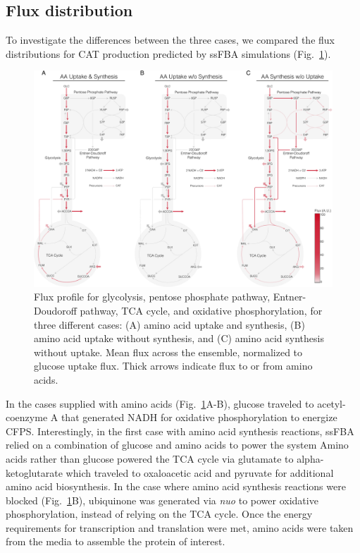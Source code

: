 \documentclass[journal=asbcd6,manuscript=article]{achemso}
\begin{document}
\subsection{Flux distribution}
To investigate the differences between the three cases, we compared the flux distributions for CAT production predicted by ssFBA simulations (Fig.~\ref{fig:flux}).
\begin{figure}[t!]
\includegraphics[width=1.00\textwidth]{./Figures/Flux.pdf}
\caption{Flux profile for glycolysis, pentose phosphate pathway, Entner-Doudoroff pathway, TCA cycle, and oxidative phosphorylation, for three different cases: (A) amino acid uptake and synthesis, (B) amino acid uptake without synthesis, and (C) amino acid synthesis without uptake. Mean flux across the ensemble, normalized to glucose uptake flux. Thick arrows indicate flux to or from amino acids.}
\label{fig:flux}
\end{figure}
In the cases supplied with amino acids (Fig.~\ref{fig:flux}A-B), glucose traveled to acetyl-coenzyme A that generated NADH for oxidative phosphorylation to energize CFPS.
Interestingly, in the first case with amino acid synthesis reactions, ssFBA relied on a combination of glucose and amino acids to power the system
Amino acids rather than glucose powered the TCA cycle via glutamate to alpha-ketoglutarate which traveled to oxaloacetic acid and pyruvate for additional amino acid biosynthesis.
In the case where amino acid synthesis reactions were blocked (Fig.~\ref{fig:flux}B), ubiquinone was generated via \textit{nuo} to power oxidative phosphorylation, instead of relying on the TCA cycle.
Once the energy requirements for transcription and translation were met, amino acids were taken from the media to assemble the protein of interest.
\end{document}

